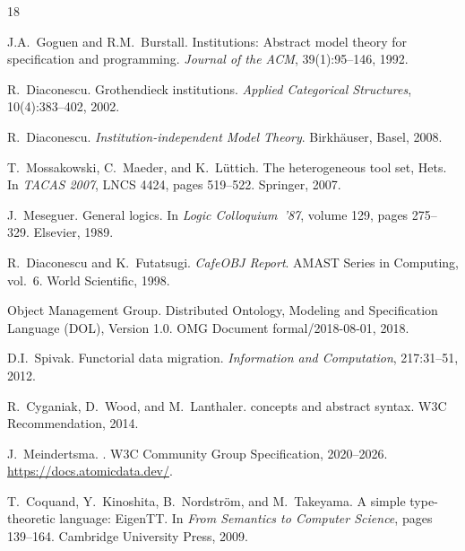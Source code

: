 \documentclass[10pt,twocolumn,letterpaper]{article}
\begin{document}

\begin{thebibliography}{18}

J.A.~Goguen and R.M.~Burstall.
\newblock Institutions: Abstract model theory for specification and programming.
\newblock \emph{Journal of the ACM}, 39(1):95--146, 1992.

R.~Diaconescu.
\newblock Grothendieck institutions.
\newblock \emph{Applied Categorical Structures}, 10(4):383--402, 2002.

R.~Diaconescu.
\newblock \emph{Institution-independent Model Theory}.
\newblock Birkh\"{a}user, Basel, 2008.

T.~Mossakowski, C.~Maeder, and K.~L\"{u}ttich.
\newblock The heterogeneous tool set, {Hets}.
\newblock In \emph{TACAS 2007}, LNCS 4424, pages 519--522. Springer, 2007.

J.~Meseguer.
\newblock General logics.
\newblock In \emph{Logic Colloquium~'87}, volume 129, pages 275--329. Elsevier, 1989.

R.~Diaconescu and K.~Futatsugi.
\newblock \emph{CafeOBJ Report}.
\newblock AMAST Series in Computing, vol.~6. World Scientific, 1998.

Object Management Group.
\newblock Distributed Ontology, Modeling and Specification Language ({DOL}), Version 1.0.
\newblock OMG Document formal/2018-08-01, 2018.

D.I.~Spivak.
\newblock Functorial data migration.
\newblock \emph{Information and Computation}, 217:31--51, 2012.

R.~Cyganiak, D.~Wood, and M.~Lanthaler.
 concepts and abstract syntax.
\newblock W3C Recommendation, 2014.

J.~Meindertsma.
.
\newblock W3C Community Group Specification, 2020--2026.
\newblock \url{https://docs.atomicdata.dev/}.

T.~Coquand, Y.~Kinoshita, B.~Nordstr\"{o}m, and M.~Takeyama.
\newblock A simple type-theoretic language: {EigenTT}.
\newblock In \emph{From Semantics to Computer Science}, pages 139--164. Cambridge University Press, 2009.


\end{thebibliography}
\end{document}
